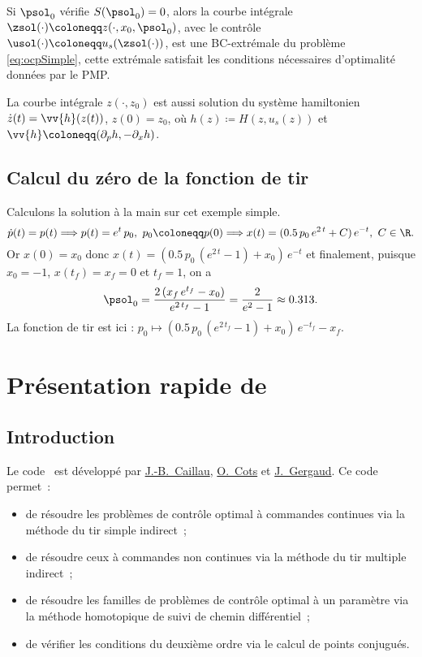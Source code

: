     \begin{myremark}
        \anoter
        Si $\psol_0$ v\'erifie $S(\psol_0)=0$, alors 
        la courbe int\'egrale $\zsol(\cdot) \coloneqq z(\cdot, x_0, \psol_0)$,
        avec le contr\^ole $\usol(\cdot) \coloneqq u_s(\zsol(\cdot))$,
        est une BC-extr\'emale du probl\`eme \eqref{eq:ocpSimple}, \ie cette extr\'emale satisfait les conditions n\'ecessaires d'optimalit\'e
        donn\'ees par le PMP.
    \end{myremark}

    \begin{myremark}
        \anoter
        La courbe int\'egrale $z(\cdot, z_0)$ est aussi solution du syst\`eme hamiltonien $\dot{z}(t) = \vv{h}(z(t))$, $z(0) = z_0$,
        o\`u $h(z) \coloneqq H(z, u_s(z))$ et $\vv{h} \coloneqq (\partial_p h, -\partial_x h)$.
    \end{myremark}

\subsection{Calcul du z\'ero de la fonction de tir}

    Calculons la solution \`a la main sur cet exemple simple.
    \[
        \dot{p}(t) = p(t) \Longrightarrow p(t) = e^t \, p_0,~ p_0 \coloneqq p(0) \Longrightarrow x(t) = (0.5\, p_0 \,e^{2\,t} + C)\, e^{-t},~ C \in \R.
    \]
    Or $x(0) = x_0$ donc 
    $
        x(t) = (0.5\, p_0 \, (e^{2\,t} - 1) + x_0 )\, e^{-t}
    $
    et finalement, puisque $x_0 = -1$, $x(t_f) = x_f = 0$ et $t_f = 1$, on a
    \[
        \psol_0 = \frac{2 \, (x_f \, e^{t_f} - x_0)}{e^{2\,t_f}-1} = \frac{2}{e^{2}-1} \approx 0.313.
    \]
    La fonction de tir est ici : $p_0 \mapsto (0.5\, p_0 \, (e^{2\,t_f} - 1) + x_0 )\, e^{-t_f} - x_f$.

\section{Pr\'esentation rapide de \hampath}

\subsection{Introduction}

Le code \hampath\ est d\'evelopp\'e par \href{http://caillau.perso.math.cnrs.fr}{J.-B.~Caillau},
\href{http://cots.perso.enseeiht.fr}{O.~Cots} et
\href{http://gergaud.perso.enseeiht.fr}{J.~Gergaud}.
Ce code permet~:
\begin{itemize}
    \item de r\'esoudre les probl\`emes de contr\^ole optimal \`a commandes continues via la m\'ethode du tir simple indirect~;
    \item de r\'esoudre ceux \`a commandes non continues via la m\'ethode du tir multiple indirect~;
    \item de r\'esoudre les familles de probl\`emes de contr\^ole optimal \`a un param\`etre via la m\'ethode homotopique de suivi de chemin
        diff\'erentiel~;
    \item de v\'erifier les conditions du deuxi\`eme ordre via le calcul de points conjugu\'es.
\end{itemize}

